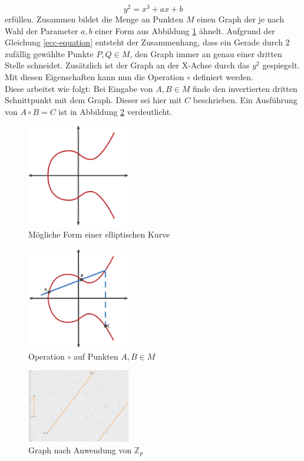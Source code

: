 \documentclass[11pt,a4paper]{scrreprt}
\begin{document}
\begin{equation}
    \label{ecc-equation}
    y^2 = x^3+ax+b
\end{equation} erfüllen. Zusammen bildet die Menge an Punkten $M$ einen Graph der je nach Wahl der Parameter $a,b$ einer Form aus Abbildung \ref{fig:ecc_1} ähnelt. Aufgrund der Gleichung \ref{ecc-equation} entsteht der Zusammenhang, dass ein Gerade durch 2 zufällig gewählte Punkte $P,Q \in M$,  den Graph immer an genau einer dritten Stelle schneidet. Zusätzlich ist der Graph an der X-Achse durch das $y^2$ gespiegelt. Mit diesen Eigenschaften kann nun die Operation $\circ$ definiert werden.\\
Diese arbeitet wie folgt: Bei Eingabe von $A,B \in M$ finde den invertierten dritten Schnittpunkt mit dem Graph. Dieser sei hier mit $C$ beschrieben. Ein Ausführung von $A \circ B = C$ ist in Abbildung \ref{fig:ecc_2} verdeutlicht.

\begin{figure}
    \centering
    \includegraphics[width=0.4\textwidth]{ecc_1.png}
    \caption{Mögliche Form einer elliptischen Kurve \cite{ecc-cloud2013elliptic}}
    \label{fig:ecc_1}
\end{figure}
\begin{figure}
    \centering
    \includegraphics[width=0.4\textwidth]{ecc_2.png}
    \caption{Operation $\circ$ auf Punkten $A,B \in M$ \cite{ecc-cloud2013elliptic}}
    \label{fig:ecc_2}
\end{figure}
\begin{figure}
    \centering
    \includegraphics[width=0.4\textwidth]{ecc_3.png}
    \caption{Graph nach Anwendung von $\mathbb{Z}_p$ \cite{ecc-cloud2013elliptic}}
    \label{fig:ecc_3}
\end{figure}
\end{document}
